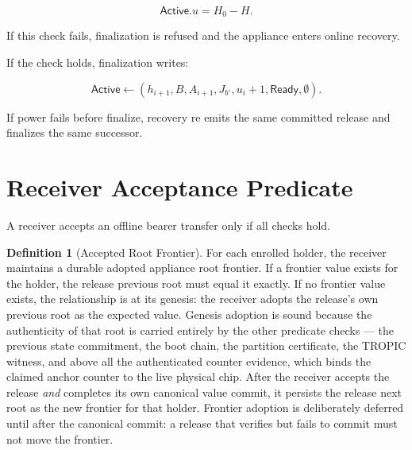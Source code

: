 \documentclass[11pt]{article}
\theoremstyle{definition}
\newtheorem{definition}[theorem]{Definition}
\theoremstyle{remark}
\newcommand{\Active}{\ensuremath{\mathsf{Active}}}
\newcommand{\Ready}{\ensuremath{\mathsf{Ready}}}
\newcommand{\Bundle}{\ensuremath{B}}
\newcommand{\Ahead}{\ensuremath{A}}
\newcommand{\Bhead}{\ensuremath{J}}
\begin{document}
\[
\Active.u = H_0-H.
\]

If this check fails, finalization is refused and the appliance enters online recovery.

If the check holds, finalization writes:

\[
\Active
\leftarrow
(
h_{i+1},
\Bundle,
\Ahead_{i+1},
\Bhead_{b'},
u_i+1,
\Ready,
\emptyset
).
\]

If power fails before finalize, recovery re emits the same committed release and finalizes the same
successor.

\section{Receiver Acceptance Predicate}

A receiver accepts an offline bearer transfer only if all checks hold.

\begin{definition}[Accepted Root Frontier]\label{def:frontier}
For each enrolled holder, the receiver maintains a durable adopted appliance root frontier. If a
frontier value exists for the holder, the release previous root must equal it exactly. If no
frontier value exists, the relationship is at its genesis: the receiver adopts the release's own
previous root as the expected value. Genesis adoption is sound because the authenticity of that
root is carried entirely by the other predicate checks --- the previous state commitment, the boot
chain, the partition certificate, the TROPIC witness, and above all the authenticated counter
evidence, which binds the claimed anchor counter to the live physical chip. After the receiver
accepts the release \emph{and} completes its own canonical value commit, it persists the release
next root as the new frontier for that holder. Frontier adoption is deliberately deferred until
after the canonical commit: a release that verifies but fails to commit must not move the
frontier.
\end{definition}
\end{document}
